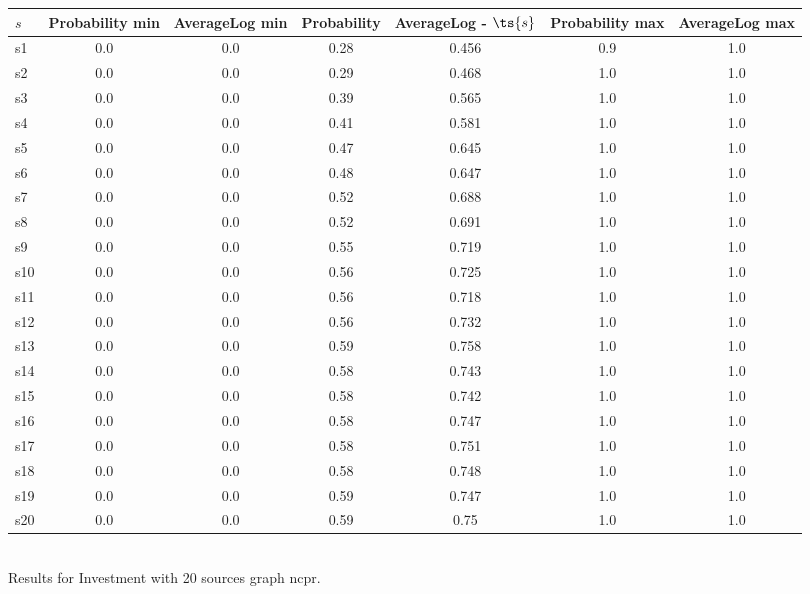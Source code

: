 \documentclass{article}
\begin{document}
\noindent\begin{tabular}{|l|c|c|c|c|c|c|}
\hline
$s$& Probability min & AverageLog min & Probability & AverageLog - $\ts{s}$ & Probability max & AverageLog max\\
\hline
s1 &0.0 & 0.0 & 0.28 & 0.456 & 0.9 & 1.0\\
\hline
s2 &0.0 & 0.0 & 0.29 & 0.468 & 1.0 & 1.0\\
\hline
s3 &0.0 & 0.0 & 0.39 & 0.565 & 1.0 & 1.0\\
\hline
s4 &0.0 & 0.0 & 0.41 & 0.581 & 1.0 & 1.0\\
\hline
s5 &0.0 & 0.0 & 0.47 & 0.645 & 1.0 & 1.0\\
\hline
s6 &0.0 & 0.0 & 0.48 & 0.647 & 1.0 & 1.0\\
\hline
s7 &0.0 & 0.0 & 0.52 & 0.688 & 1.0 & 1.0\\
\hline
s8 &0.0 & 0.0 & 0.52 & 0.691 & 1.0 & 1.0\\
\hline
s9 &0.0 & 0.0 & 0.55 & 0.719 & 1.0 & 1.0\\
\hline
s10 &0.0 & 0.0 & 0.56 & 0.725 & 1.0 & 1.0\\
\hline
s11 &0.0 & 0.0 & 0.56 & 0.718 & 1.0 & 1.0\\
\hline
s12 &0.0 & 0.0 & 0.56 & 0.732 & 1.0 & 1.0\\
\hline
s13 &0.0 & 0.0 & 0.59 & 0.758 & 1.0 & 1.0\\
\hline
s14 &0.0 & 0.0 & 0.58 & 0.743 & 1.0 & 1.0\\
\hline
s15 &0.0 & 0.0 & 0.58 & 0.742 & 1.0 & 1.0\\
\hline
s16 &0.0 & 0.0 & 0.58 & 0.747 & 1.0 & 1.0\\
\hline
s17 &0.0 & 0.0 & 0.58 & 0.751 & 1.0 & 1.0\\
\hline
s18 &0.0 & 0.0 & 0.58 & 0.748 & 1.0 & 1.0\\
\hline
s19 &0.0 & 0.0 & 0.59 & 0.747 & 1.0 & 1.0\\
\hline
s20 &0.0 & 0.0 & 0.59 & 0.75 & 1.0 & 1.0\\
\hline
\end{tabular}\\

\noindent Results for Investment with 20 sources graph ncpr.
\end{document}
